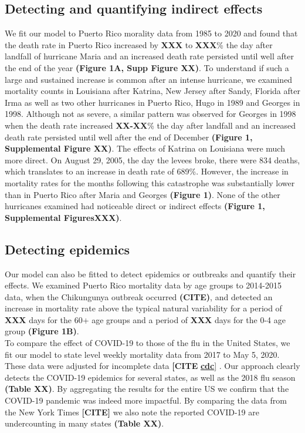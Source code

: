 \documentclass[11pt]{article}
\begin{document}
\subsection{Detecting and quantifying indirect effects}
\label{subsec:effects}
We fit our model to Puerto Rico morality data from 1985 to 2020 and found that the death rate in Puerto Rico increased by \textbf{XXX} to \textbf{XXX}\% the day after landfall of hurricane Maria and an increased death rate persisted until well after the end of the year \textbf{(Figure 1A, Supp Figure XX)}. To understand if such a large and sustained increase is common after an intense hurricane, we examined mortality counts in Louisiana after Katrina, New Jersey after Sandy, Florida after Irma as well as two other hurricanes in Puerto Rico, Hugo in 1989 and Georges in 1998.  Although not as severe, a similar pattern was observed for Georges in 1998 when the death rate increased \textbf{XX-XX}\% the day after landfall and an increased death rate persisted until well after the end of December \textbf{(Figure 1, Supplemental Figure XX)}. The effects of Katrina on Louisiana were much more direct. On August 29, 2005, the day the levees broke, there were 834 deaths, which translates to an increase in death rate of 689\%. However, the increase in mortality rates for the months following this catastrophe was substantially lower than in Puerto Rico after Maria and Georges \textbf{(Figure 1)}. None of the other hurricanes examined had noticeable direct or indirect effects \textbf{(Figure 1, Supplemental FiguresXXX)}.

\subsection{Detecting epidemics}
\label{subsec:epidemics}
Our model can also be fitted to detect epidemics or outbreaks and quantify their effects. We examined Puerto Rico mortality data by age groups to 2014-2015 data, when the Chikungunya outbreak occurred \textbf{(CITE)}, and detected an increase in mortality rate above the typical natural variability for a period of \textbf{XXX} days for the 60+ age groups and a period of \textbf{XXX} days for the  0-4 age group \textbf{(Figure 1B)}. \\

To compare the effect of COVID-19 to those of the flu in the United States, we fit our model to state level weekly mortality data from 2017 to May 5, 2020. These data were adjusted for incomplete data \textbf{[CITE }\href{https://www.cdc.gov/nchs/nvss/vsrr/covid19/excess_deaths.htm}{\textbf{cdc}]} . Our approach clearly detects the COVID-19 epidemics for several states, as well as the 2018 flu season \textbf{(Table XX)}. By aggregating the results for the entire US we confirm that the COVID-19 pandemic was indeed more impactful. By comparing the data from the New York Times \textbf{[CITE]} we also note the reported COVID-19 are undercounting in many states \textbf{(Table XX)}.
\end{document}
